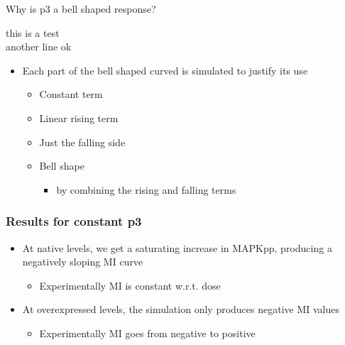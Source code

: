 

\begin{frame}{Why is p3 a bell shaped response?}
  \begin{reference}{4mm}{85mm}
    this is a test \\
    another line ok
  \end{reference}
  \begin{itemize}
    \itemsep3em
    \item Each part of the bell shaped curved is simulated to justify its use
    \begin{itemize}
      \item Constant term
      \item Linear rising term
      \item Just the falling side
      \item Bell shape
      \begin{itemize}
        \item by combining the rising and falling terms 
      \end{itemize}
    \end{itemize}
  \end{itemize}
\end{frame}


\begin{frame}
  \frametitle{Results for constant p3}
  \begin{itemize}
    \itemsep3em
    \item At native levels, we get a saturating increase in MAPKpp, producing
      a negatively sloping MI curve
      \begin{itemize}
          \item Experimentally MI is constant w.r.t. dose
      \end{itemize}
    \item At overexpressed levels, the simulation only produces negative MI
      values
      \begin{itemize}
          \item Experimentally MI goes from negative to positive
      \end{itemize}
  \end{itemize}
\end{frame}

